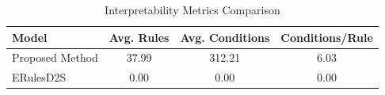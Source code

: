 \begin{table}[htbp]
\centering
\caption{Interpretability Metrics Comparison}
\label{tab:complexity}
\begin{tabular}{lccc}
\toprule
Model & Avg. Rules & Avg. Conditions & Conditions/Rule \\
\midrule
Proposed Method & 37.99 & 312.21 & 6.03 \\
ERulesD2S & 0.00 & 0.00 & 0.00 \\
\bottomrule
\end{tabular}
\end{table}